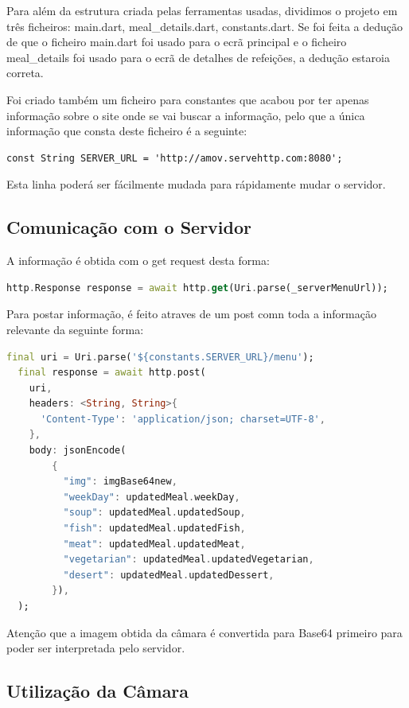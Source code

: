 \documentclass[10pt]{article}
\begin{document}
        Para além da estrutura criada pelas ferramentas usadas, dividimos o projeto em três ficheiros: main.dart, meal\_details.dart, constants.dart. Se foi feita a dedução de que o ficheiro main.dart foi usado para o ecrã principal e o ficheiro meal\_details foi usado para o ecrã de detalhes de refeições, a dedução estaroia correta.

        Foi criado também um ficheiro para constantes que acabou por ter apenas informação sobre o site onde se vai buscar a informação, pelo que a única informação que consta deste ficheiro é a seguinte:
        \begin{lstlisting}
const String SERVER_URL = 'http://amov.servehttp.com:8080';
        \end{lstlisting}
        Esta linha poderá ser fácilmente mudada para rápidamente mudar o servidor.

 
	\subsection{Comunicação com o Servidor}

        A informação é obtida com o get request desta forma:

        \begin{lstlisting}[language=Dart]
http.Response response = await http.get(Uri.parse(_serverMenuUrl));
        \end{lstlisting}

        Para postar informação, é feito atraves de um post comn toda a informação relevante da seguinte forma:

        \begin{lstlisting}[language=Dart]
  final uri = Uri.parse('${constants.SERVER_URL}/menu');
  final response = await http.post(
    uri,
    headers: <String, String>{
      'Content-Type': 'application/json; charset=UTF-8',
    },
    body: jsonEncode(
        {
          "img": imgBase64new,
          "weekDay": updatedMeal.weekDay,
          "soup": updatedMeal.updatedSoup,
          "fish": updatedMeal.updatedFish,
          "meat": updatedMeal.updatedMeat,
          "vegetarian": updatedMeal.updatedVegetarian,
          "desert": updatedMeal.updatedDessert,
        }),
  );
        \end{lstlisting}

        Atenção que a imagem obtida da câmara é convertida para Base64 primeiro para poder ser interpretada pelo servidor.

        \subsection{Utilização da Câmara}
\end{document}
